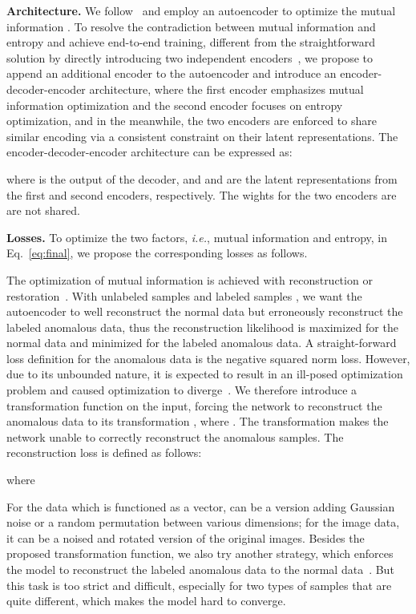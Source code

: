 \documentclass{bmvc2k}
\begin{document}
\noindent \textbf{Architecture.} We follow~\cite{SAD} and employ an autoencoder to optimize the mutual information . 
To resolve the contradiction between mutual information and entropy and achieve end-to-end training, different from the straightforward solution by directly introducing two independent encoders~\cite{TLSAD}, we propose to append an additional encoder to the autoencoder and introduce an encoder-decoder-encoder architecture, where the first encoder  emphasizes mutual information optimization and the second encoder  focuses on entropy optimization, and in the meanwhile, the two encoders are enforced to share similar encoding via a consistent constraint on their latent representations. The encoder-decoder-encoder architecture can be expressed as:
                     
where  is the output of the decoder, and  and  are the latent representations from the first and second encoders, respectively. The wights for the two encoders are are not shared.

\noindent \textbf{Losses.} To optimize the two factors, \textit{i.e.}, mutual information and entropy, in Eq.~\eqref{eq:final}, we propose the corresponding losses as follows.

The optimization of mutual information is achieved with reconstruction or restoration~\cite{vincent2008extracting}. With unlabeled samples  and labeled samples , we want the autoencoder to well reconstruct the normal data but erroneously reconstruct the labeled anomalous data, thus the reconstruction likelihood is maximized for the normal data and minimized for the labeled anomalous data. A straight-forward loss definition for the anomalous data is the negative squared norm loss. However, due to its unbounded nature, it is expected to result in an ill-posed optimization problem and caused optimization to diverge~\cite{SAD}. We therefore introduce a transformation function  on the input, forcing the network to reconstruct the anomalous data  to its transformation  , where . The transformation makes the network unable to correctly reconstruct the anomalous samples. The reconstruction loss is defined as follows:

where

For the data which is functioned as a vector,  can be a version adding Gaussian noise or a random permutation between various dimensions; for the image data, it can be a noised and rotated version of the original images. Besides the proposed transformation function, we also try another strategy, which enforces the model to reconstruct the labeled anomalous data to the normal data~\cite{perera2019ocgan}. But this task is too strict and difficult, especially for two types of samples that are quite different, which makes the model hard to converge.
\end{document}
